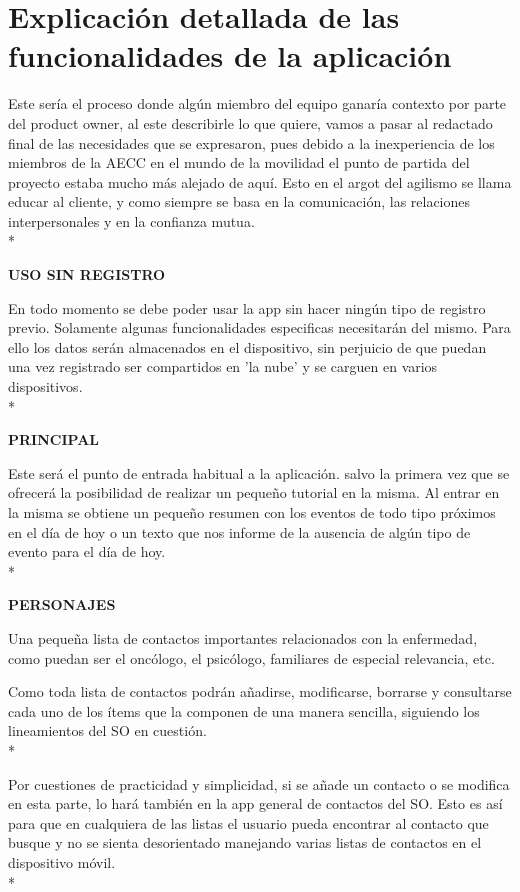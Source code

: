 \documentclass[../pfc.tex]{subfiles}
\begin{document}
	\section{Explicación detallada de las funcionalidades de la aplicación}

Este sería el proceso donde algún miembro del equipo ganaría contexto por parte del product owner, al este describirle lo que quiere, vamos a pasar al redactado final de las necesidades que se expresaron, pues debido a la inexperiencia de los miembros de la AECC en el mundo de la movilidad el punto de partida del proyecto estaba mucho más alejado de aquí. Esto en el argot del agilismo se llama educar al cliente, y como siempre se basa en la comunicación, las relaciones interpersonales y en la confianza mutua.\\*

\textbf{USO SIN REGISTRO}

En todo momento se debe poder usar la app sin hacer ningún tipo de registro previo. Solamente algunas funcionalidades especificas necesitarán del mismo. Para ello los datos serán almacenados en el dispositivo, sin perjuicio de que puedan una vez registrado ser compartidos en 'la nube' y se carguen en varios dispositivos.\\*

	\textbf{PRINCIPAL}
	
	Este será el punto de entrada habitual a la aplicación. salvo la primera vez que se ofrecerá la posibilidad de realizar un pequeño tutorial en la misma. Al entrar en la misma se obtiene un pequeño resumen con los eventos de todo tipo próximos en el día de hoy o un texto que nos informe de la ausencia de algún tipo de evento para el día de hoy.\\*

	
	\textbf{PERSONAJES}
	
	Una pequeña lista de contactos importantes relacionados con la enfermedad, como puedan ser el oncólogo, el psicólogo, familiares de especial relevancia, etc.
	
	Como toda lista de contactos podrán añadirse, modificarse, borrarse y consultarse cada uno de los ítems que la componen de una manera sencilla, siguiendo los lineamientos del SO en cuestión.\\*
	
	Por cuestiones de practicidad y simplicidad, si se añade un contacto o se modifica en esta parte, lo hará también en la app general de contactos del SO. Esto es así para que en cualquiera de las listas el usuario pueda encontrar al contacto que busque y no se sienta desorientado manejando varias listas de contactos en el dispositivo móvil. \\*
	
\end{document}
